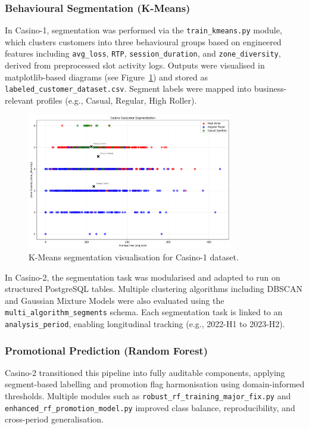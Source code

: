 \documentclass[12pt,a4paper]{report}
\begin{document}
\subsubsection*{Behavioural Segmentation (K-Means)}

In Casino-1, segmentation was performed via the \texttt{train\_kmeans.py} module, which clusters customers into three behavioural groups based on engineered features including \texttt{avg\_loss}, \texttt{RTP}, \texttt{session\_duration}, and \texttt{zone\_diversity}, derived from preprocessed slot activity logs. Outputs were visualised in matplotlib-based diagrams (see Figure~\ref{fig:casino1_segmentation}) and stored as \texttt{labeled\_customer\_dataset.csv}. Segment labels were mapped into business-relevant profiles (e.g., Casual, Regular, High Roller).

\begin{figure}[H]
\centering
\includegraphics[width=0.8\textwidth]{figures/segmentation_analysis.png}
\caption{K-Means segmentation visualisation for Casino-1 dataset.}
\label{fig:casino1_segmentation}
\end{figure}

In Casino-2, the segmentation task was modularised and adapted to run on structured PostgreSQL tables. Multiple clustering algorithms including DBSCAN and Gaussian Mixture Models were also evaluated using the \texttt{multi\_algorithm\_segments} schema. Each segmentation task is linked to an \texttt{analysis\_period}, enabling longitudinal tracking (e.g., 2022-H1 to 2023-H2).

\subsubsection*{Promotional Prediction (Random Forest)}


Casino-2 transitioned this pipeline into fully auditable components, applying segment-based labelling and promotion flag harmonisation using domain-informed thresholds. Multiple modules such as \texttt{robust\_rf\_training\_major\_fix.py} and \texttt{enhanced\_rf\_promotion\_model.py} improved class balance, reproducibility, and cross-period generalisation.
\end{document}

